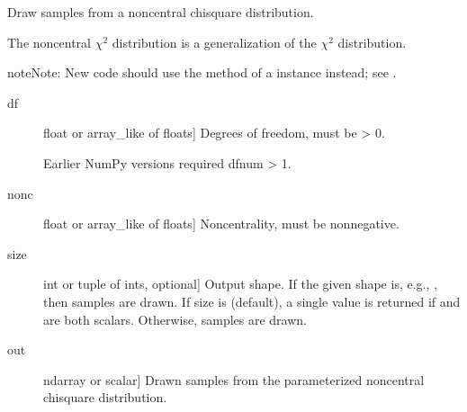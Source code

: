 \documentclass[letterpaper,10pt,english]{sphinxmanual}
\begin{document}

\begin{fulllineitems}
\label{\detokenize{infrapy.utils:infrapy.utils.ref2sac.noncentral_chisquare}}
Draw samples from a noncentral chi\sphinxhyphen{}square distribution.

The noncentral \(\chi^2\) distribution is a generalization of
the \(\chi^2\) distribution.

\begin{sphinxadmonition}{note}{Note:}
New code should use the  method of a 
instance instead; see .
\end{sphinxadmonition}
\begin{description}
\item[{df}] \leavevmode{[}float or array\_like of floats{]}
Degrees of freedom, must be \textgreater{} 0.

Earlier NumPy versions required dfnum \textgreater{} 1.

\item[{nonc}] \leavevmode{[}float or array\_like of floats{]}
Non\sphinxhyphen{}centrality, must be non\sphinxhyphen{}negative.

\item[{size}] \leavevmode{[}int or tuple of ints, optional{]}
Output shape.  If the given shape is, e.g., , then
 samples are drawn.  If size is  (default),
a single value is returned if  and  are both scalars.
Otherwise,  samples are drawn.

\end{description}
\begin{description}
\item[{out}] \leavevmode{[}ndarray or scalar{]}
Drawn samples from the parameterized noncentral chi\sphinxhyphen{}square distribution.


\end{description}
\end{fulllineitems}
\end{document}
